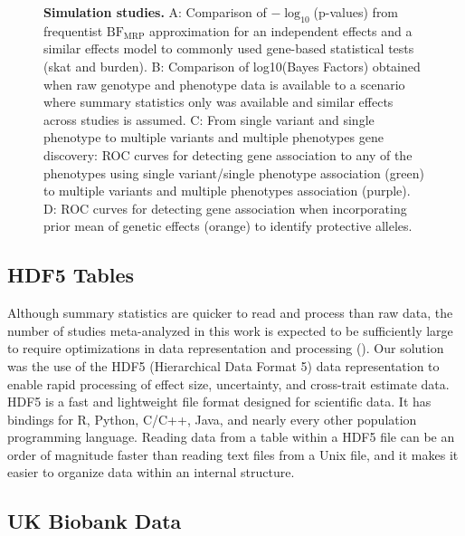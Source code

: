 \begin{figure}[!h]
\caption{{\bf Simulation studies.}
A: Comparison of $-\log_{10}$(p-values) from frequentist $\textrm{BF}_{\textrm{MRP}}$ approximation for an independent effects and a similar effects model to commonly used gene-based statistical tests (skat and burden). B: Comparison of log10(Bayes Factors) obtained when raw genotype and phenotype data is available to a scenario where summary statistics only was available and similar effects across studies is assumed. C: From single variant and single phenotype to multiple variants and multiple phenotypes gene discovery: ROC curves for detecting gene association to any of the phenotypes using single variant/single phenotype association (green) to multiple variants and multiple phenotypes association (purple). D: ROC curves for detecting gene association when incorporating prior mean of genetic effects (orange) to identify protective alleles.}
\label{simresults}
\end{figure}

\subsection*{HDF5 Tables}
Although summary statistics are quicker to read and process than raw data, the number of studies meta-analyzed in this work is expected to be sufficiently large to require optimizations in data representation and processing (). Our solution was the use of the HDF5 (Hierarchical Data Format 5) data representation to enable rapid processing of effect size, uncertainty, and cross-trait estimate data. HDF5 is a fast and lightweight file format designed for scientific data. It has bindings for R, Python, C/C++, Java, and nearly every other population programming language. Reading data from a table within a HDF5 file can be an order of magnitude faster than reading text files from a Unix file, and it makes it easier to organize data within an internal structure.

\subsection*{UK Biobank Data}
